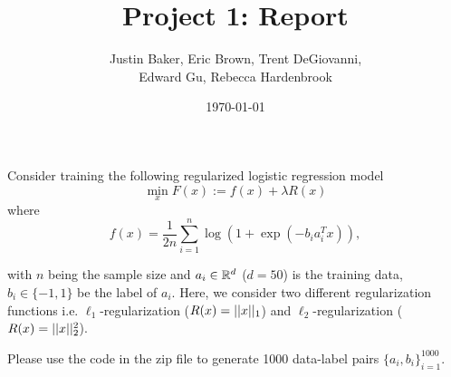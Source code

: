 \documentclass[11pt, answers]{exam}
\title{Project 1: Report}
\author{Justin Baker, Eric Brown, Trent DeGiovanni,\\ Edward Gu, Rebecca Hardenbrook}
\date{\today}
\begin{document}
\maketitle

Consider training the following regularized logistic regression model
$$\min_x F(x):= f(x)+\lambda R(x)$$
where
$$f(x)=\frac{1}{2n}\sum^n_{i=1}\log(1+\exp(-b_ia_i^Tx)),$$

with $n$ being the sample size and $a_i\in\mathbb{R}^d$ ($d=50$) is the training data,
$b_i\in\{-1,1\}$ be the label of $a_i$. 
Here, we consider two different regularization functions 
i.e. $\ell_1$-regularization ($R(x)=|| x ||_1$) 
and $\ell_2$-regularization ($R(x)=|| x ||_2^2$).


Please use the code in the zip file to generate 1000 data-label pairs $\{a_i,b_i\}^{1000}_{i=1}.$
\end{document}

